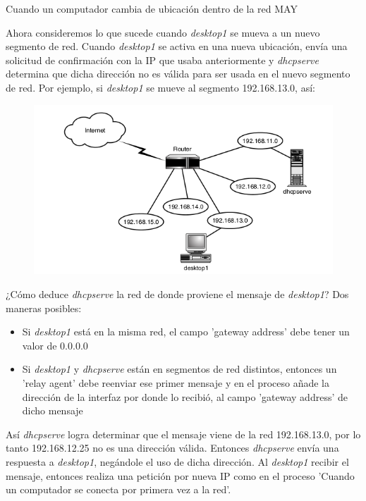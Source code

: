 \begin{frame}{Cuando un computador cambia de
ubicación dentro de la red MAY} 

    Ahora consideremos lo que sucede cuando \textit{desktop1} se mueva a un
    nuevo segmento de red. Cuando \textit{desktop1} se activa en una nueva
    ubicación, envía una solicitud de confirmación con la IP que usaba
    anteriormente y \textit{dhcpserve} determina que dicha dirección no es
    válida para ser usada en el nuevo segmento de red. Por ejemplo, si
    \textit{desktop1} se mueve al segmento 192.168.13.0, así:

    \begin{figure}
    \begin{center}

    \includegraphics[scale=0.50]{images/2-4.png}
    \label{MAY-4}

    \end{center}
    \end{figure}

    \framebreak
    
    ¿Cómo deduce \textit{dhcpserve} la red de donde proviene el mensaje de
    \textit{desktop1}? Dos maneras posibles:

    \begin{itemize}
        \item Si \textit{desktop1} está en la misma red, el campo 'gateway
        address' debe tener un valor de 0.0.0.0
        \item Si \textit{desktop1} y \textit{dhcpserve} están en segmentos de
        red distintos, entonces un 'relay agent' debe reenviar ese primer
        mensaje y en el proceso añade la dirección de la interfaz por donde
        lo recibió, al campo 'gateway address' de dicho mensaje
    \end{itemize}

    Así \textit{dhcpserve} logra determinar que el mensaje viene de la red
    192.168.13.0, por lo tanto 192.168.12.25 no es una dirección válida.
    Entonces \textit{dhcpserve} envía una respuesta a \textit{desktop1},
    negándole el uso de dicha dirección. Al \textit{desktop1} recibir el
    mensaje, entonces realiza una petición por nueva IP como en el proceso
    'Cuando un computador se conecta por primera vez a la red'.\\[0.2cm]

\end{frame}

